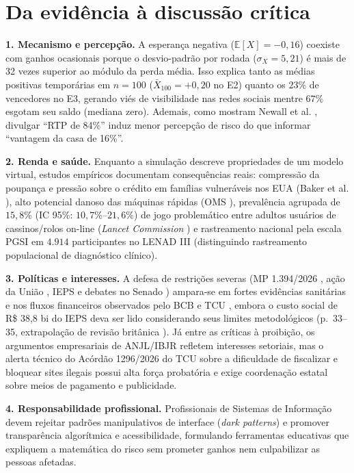 \documentclass[10pt,a4paper]{article}
\begin{document}
\section{Da evidência à discussão crítica}

\textbf{1. Mecanismo e percepção.} A esperança negativa ($\mathbb{E}[X] = -0{,}16$) coexiste com ganhos ocasionais porque o desvio-padrão por rodada ($\sigma_X = 5{,}21$) é mais de 32 vezes superior ao módulo da perda média. Isso explica tanto as médias positivas temporárias em $n=100$ ($\bar{X}_{100}=+0{,}20$ no E2) quanto os $23\%$ de vencedores no E3, gerando viés de visibilidade nas redes sociais mentre $67\%$ esgotam seu saldo (mediana zero). Ademais, como mostram Newall et al. \cite{newall2020}, divulgar ``RTP de 84\%'' induz menor percepção de risco do que informar ``vantagem da casa de 16\%''.

\textbf{2. Renda e saúde.} Enquanto a simulação descreve propriedades de um modelo virtual, estudos empíricos documentam consequências reais: compressão da poupança e pressão sobre o crédito em famílias vulneráveis nos EUA (Baker et al. \cite{baker2024}), alto potencial danoso das máquinas rápidas (OMS \cite{oms2024}), prevalência agrupada de $15{,}8\%$ (IC 95\%: $10{,}7\%$--$21{,}6\%$) de jogo problemático entre adultos usuários de cassinos/rolos on-line (\textit{Lancet Commission} \cite{wardle2024}) e rastreamento nacional pela escala PGSI em $4.914$ participantes no LENAD III \cite{lenad2025} (distinguindo rastreamento populacional de diagnóstico clínico).

\textbf{3. Políticas e interesses.} A defesa de restrições severas (MP 1.394/2026 \cite{mp1394,ms2026}, ação da União \cite{richter2026}, IEPS \cite{ieps2025} e debates no Senado \cite{tvsenado2026}) ampara-se em fortes evidências sanitárias e nos fluxos financeiros observados pelo BCB \cite{bcb2024} e TCU \cite{tcu2026}, embora o custo social de R\$ 38,8 bi do IEPS \cite{ieps2025} deva ser lido considerando seus limites metodológicos (p.\ 33--35, extrapolação de revisão britânica \cite{ohid2023}). Já entre as críticas à proibição, os argumentos empresariais de ANJL/IBJR \cite{pontes2026} refletem interesses setoriais, mas o alerta técnico do Acórdão 1296/2026 do TCU \cite{tcu2026} sobre a dificuldade de fiscalizar e bloquear sites ilegais possui alta força probatória e exige coordenação estatal sobre meios de pagamento e publicidade.

\textbf{4. Responsabilidade profissional.} Profissionais de Sistemas de Informação devem rejeitar padrões manipulativos de interface (\textit{dark patterns}) e promover transparência algorítmica e acessibilidade, formulando ferramentas educativas que expliquem a matemática do risco sem prometer ganhos nem culpabilizar as pessoas afetadas.
\end{document}
